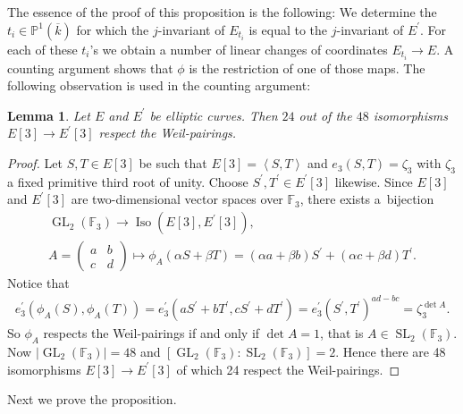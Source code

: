 \documentclass[11pt]{article}
\newcommand{\mff}{{\mathbb{F}}}
\newcommand{\mpp}{{\mathbb{P}}}
\newcommand{\mseta}[1]{{\left\langle{#1}\right\rangle}}		%
\newcommand{\msetp}[1]{{\left({#1}\right)}}					%
\newcommand{\msets}[1]{{\left[{#1}\right]}}					%
\newcommand{\msetv}[1]{{\left|{#1}\right|}}					%
\newcommand{\mac}[1]{{\overline{#1}}}
\newcommand{\mgl}[2]{{\operatorname{GL}_{#1}}\msetp{#2}}		%
\newcommand{\miso}[1]{\operatorname{Iso}\msetp{#1}}			%
\newcommand{\mps}[2]{{\mpp^{#1}\msetp{#2}}}						%
\newcommand{\msl}[2]{{\operatorname{SL}_{#1}}\msetp{#2}}		%
\numberwithin{equation}{section}
\newtheorem{Lemma}[Theorem]{Lemma}
\begin{document}
The essence of the proof of this proposition is the following: We determine the $t_i\in\mps{1}{\mac{k}}$ for which the $j$-invariant of $E_{t_i}$ is equal to the $j$-invariant of $E^\prime$. For each of these $t_i$'s we obtain a number of linear changes of coordinates $E_{t_i}\rightarrow E$. A counting argument shows that $\phi$ is the restriction of one of those maps. The following observation is used in the counting argument:

\begin{Lemma}\label{hpga:lem:cwpi} Let $E$ and $E^\prime$ be elliptic curves. Then $24$ out of the $48$ isomorphisms $E \msets{3}\rightarrow E^\prime\msets{3}$ respect the Weil-pairings.
\end{Lemma}
\begin{proof}Let $S,T\in E\msets{3}$ be such that $E\msets{3}=\mseta{S,T}$ and $e_3\msetp{S, T}=\zeta_3$ with $\zeta_3$ a fixed primitive third root of unity. Choose $S^\prime,T^\prime\in E^\prime\msets{3}$ likewise. Since $E\msets{3}$ and $E^\prime \msets{3}$ are two-dimensional vector spaces over $\mff_3$, there exists a~bijection
\begin{gather*}
\mgl{2}{\mff_3}\longrightarrow\miso{E\msets{3},E^\prime\msets{3}}, \\
A =\begin{pmatrix}a & b \\
c & d
\end{pmatrix}
\longmapsto \phi_A\msetp{\alpha S+\beta T} =\msetp{\alpha a+\beta b}S^\prime+\msetp{\alpha c+\beta d}T^\prime.
\end{gather*}
Notice that
\begin{gather*}
e_3^\prime\msetp{\phi_A\msetp{S},\phi_A\msetp{T}}=e_3^\prime\msetp{aS^\prime+bT^\prime,cS^\prime+dT^\prime} =e_3^\prime\msetp{S^\prime,T^\prime}^{ad-bc} =\zeta_3^{\det{A}}.
\end{gather*}
So $\phi_A$ respects the Weil-pairings if and only if $\det{A}=1$, that is $A\in \msl{2}{\mff_3}$. Now $\msetv{\mgl{2}{\mff_3}}=48$ and $\msets{\mgl{2}{\mff_3}\colon \msl{2}{\mff_3}}=2$. Hence there are 48 isomorphisms $E\msets{3}\rightarrow E^\prime\msets{3}$ of which 24 respect the Weil-pairings.
\end{proof}

Next we prove the proposition.
\end{document}
